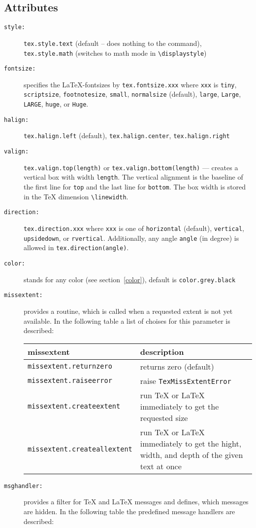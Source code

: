 \subsection{Attributes}
\begin{description}
\item[\texttt{style:}] \verb|tex.style.text| (default -- does nothing to
the command),\\\verb|tex.style.math| (switches to math mode in
\verb|\displaystyle|)
\item[\texttt{fontsize:}] specifies the \LaTeX-fontsizes by
\verb|tex.fontsize.xxx| where \verb|xxx| is
\verb|tiny|,
\verb|scriptsize|,
\verb|footnotesize|,
\verb|small|,
\verb|normalsize| (default),
\verb|large|,
\verb|Large|,
\verb|LARGE|,
\verb|huge|, or
\verb|Huge|.
\item[\texttt{halign:}] \verb|tex.halign.left| (default),
\verb|tex.halign.center|, \verb|tex.halign.right|
\item[\texttt{valign:}] \verb|tex.valign.top(length)| or
\verb|tex.valign.bottom(length)| --- creates a vertical box with width
\verb|length|. The vertical alignment is the baseline of the first line
for \verb|top| and the last line for \verb|bottom|. The box width is
stored in the \TeX{} dimension \verb|\linewidth|.
\item[\texttt{direction:}] \verb|tex.direction.xxx| where \verb|xxx| is
one of \verb|horizontal| (default), \verb|vertical|, \verb|upsidedown|,
or \verb|rvertical|. Additionally, any angle \verb|angle| (in degree) is
allowed in \verb|tex.direction(angle)|.
\item[\texttt{color:}] stands for any \PyX{} color (see
section~\ref{color}), default is \verb|color.grey.black|
\item[\texttt{missextent:}] provides a routine, which is called when a
requested extent is not yet available. In the following table a list
of choises for this parameter is described:

\bigskip
\begin{tabularx}{\linewidth}{l>{\raggedright\arraybackslash}X}
missextent&description\\
\hline
\texttt{missextent.returnzero}&returns zero (default)\\
\texttt{missextent.raiseerror}&raise \texttt{TexMissExtentError}\\
\texttt{missextent.createextent}&run \TeX{} or \LaTeX{} immediately to
get the requested size\\
\texttt{missextent.createallextent}&run \TeX{} or \LaTeX{} immediately
to get the hight, width, and depth of the given text at once\\
\end{tabularx}
\item[\texttt{msghandler:}] provides a filter for \TeX{} and \LaTeX{}
messages and defines, which messages are hidden. In the following table
the predefined message handlers are described:


\end{description}
